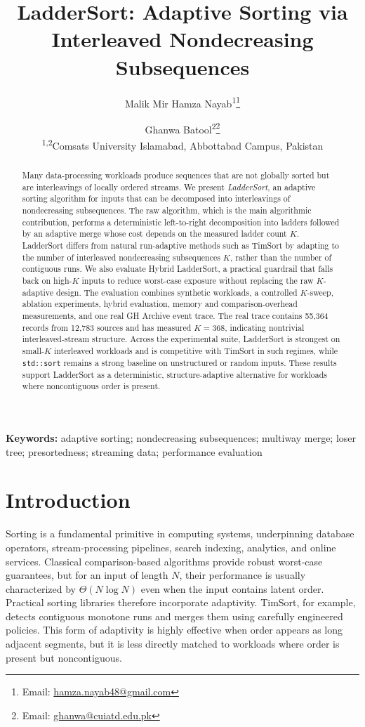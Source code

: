 \documentclass[10pt]{article}
\title{LadderSort: Adaptive Sorting via Interleaved Nondecreasing Subsequences}
\author{%
  Malik Mir Hamza Nayab\textsuperscript{1}\thanks{Email: \href{mailto:hamza.nayab48@gmail.com}{hamza.nayab48@gmail.com}} \and
  Ghanwa Batool\textsuperscript{2}\thanks{Email: \href{mailto:ghanwa@cuiatd.edu.pk}{ghanwa@cuiatd.edu.pk}}\\[0.5em]
  \textsuperscript{1,2}Comsats University Islamabad, Abbottabad Campus, Pakistan
}
\date{}
\begin{document}
\maketitle

\begin{abstract}
Many data-processing workloads produce sequences that are not globally sorted but are interleavings of locally ordered streams. We present \emph{LadderSort}, an adaptive sorting algorithm for inputs that can be decomposed into interleavings of nondecreasing subsequences. The raw algorithm, which is the main algorithmic contribution, performs a deterministic left-to-right decomposition into ladders followed by an adaptive merge whose cost depends on the measured ladder count \(K\). LadderSort differs from natural run-adaptive methods such as TimSort by adapting to the number of interleaved nondecreasing subsequences \(K\), rather than the number of contiguous runs. We also evaluate Hybrid LadderSort, a practical guardrail that falls back on high-\(K\) inputs to reduce worst-case exposure without replacing the raw \(K\)-adaptive design. The evaluation combines synthetic workloads, a controlled \(K\)-sweep, ablation experiments, hybrid evaluation, memory and comparison-overhead measurements, and one real GH Archive event trace. The real trace contains 55,364 records from 12,783 sources and has measured \(K=368\), indicating nontrivial interleaved-stream structure. Across the experimental suite, LadderSort is strongest on small-\(K\) interleaved workloads and is competitive with TimSort in such regimes, while \texttt{std::sort} remains a strong baseline on unstructured or random inputs. These results support LadderSort as a deterministic, structure-adaptive alternative for workloads where noncontiguous order is present.
\end{abstract}

\noindent\textbf{Keywords:} adaptive sorting; nondecreasing subsequences; multiway merge; loser tree; presortedness; streaming data; performance evaluation

\clearpage

\section{Introduction}

Sorting is a fundamental primitive in computing systems, underpinning database operators, stream-processing pipelines, search indexing, analytics, and online services. Classical comparison-based algorithms provide robust worst-case guarantees, but for an input of length \(N\), their performance is usually characterized by \(\Theta(N\log N)\) even when the input contains latent order. Practical sorting libraries therefore incorporate adaptivity. TimSort, for example, detects contiguous monotone runs and merges them using carefully engineered policies. This form of adaptivity is highly effective when order appears as long adjacent segments, but it is less directly matched to workloads where order is present but noncontiguous.
\end{document}
